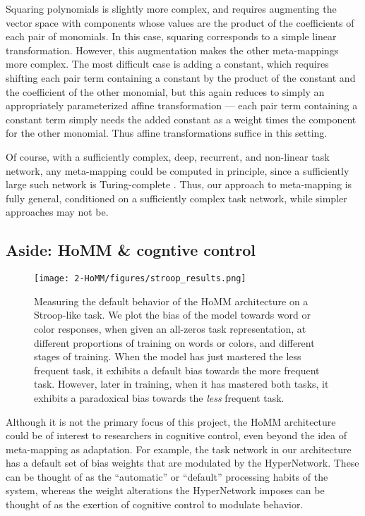 Squaring polynomials is slightly more complex, and requires augmenting the vector space with components whose values are the product of the coefficients of each pair of monomials. In this case, squaring corresponds to a simple linear transformation. However, this augmentation makes the other meta-mappings more complex. The most difficult case is adding a constant, which requires shifting each pair term containing a constant by the product of the constant and the coefficient of the other monomial, but this again reduces to simply an appropriately parameterized affine transformation --- each pair term containing a constant term simply needs the added constant as a weight times the component for the other monomial. Thus affine transformations suffice in this setting.

Of course, with a sufficiently complex, deep, recurrent, and non-linear task network, any meta-mapping could be computed in principle, since a sufficiently large such network is Turing-complete \citep{Siegelman1992}. Thus, our approach to meta-mapping is fully general, conditioned on a sufficiently complex task network, while simpler approaches may not be.



\subsection{Aside: HoMM \& cogntive control}
\begin{figure}
\centering
\texttt{[image: 2-HoMM/figures/stroop\_results.png]}
\caption[Measuring the default behavior of the HoMM architecture on a Stroop-like task.]{Measuring the default behavior of the HoMM architecture on a Stroop-like task. We plot the bias of the model towards word or color responses, when given an all-zeros task representation, at different proportions of training on words or colors, and different stages of training. When the model has just mastered the less frequent task, it exhibits a default bias towards the more frequent task. However, later in training, when it has mastered both tasks, it exhibits a paradoxical bias towards the \emph{less} frequent task.} \label{supp_fig:HoMM_cognitive_control}
\end{figure}

Although it is not the primary focus of this project, the HoMM architecture could be of interest to researchers in cognitive control, even beyond the idea of meta-mapping as adaptation. For example, the task network in our architecture has a default set of bias weights that are modulated by the HyperNetwork. These can be thought of as the ``automatic'' or ``default'' processing habits of the system, whereas the weight alterations the HyperNetwork imposes can be thought of as the exertion of cognitive control to modulate behavior. 

